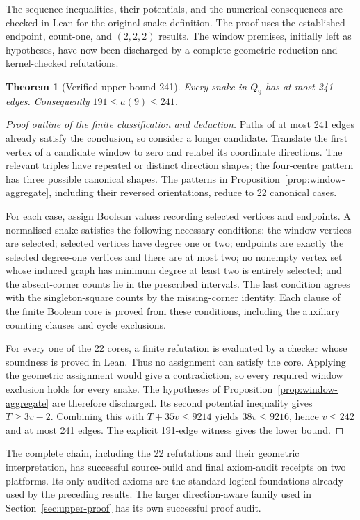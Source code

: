 \documentclass[11pt,a4paper]{article}
\newtheorem{theorem}{Theorem}[section]
\theoremstyle{definition}
\theoremstyle{remark}
\newcommand{\Q}{Q}
\begin{document}
The sequence inequalities, their potentials, and the numerical consequences are checked in Lean for the original snake definition. The proof uses the established endpoint, count-one, and $(2,2,2)$ results. The window premises, initially left as hypotheses, have now been discharged by a complete geometric reduction and kernel-checked refutations.

\begin{theorem}[Verified upper bound 241]\label{thm:upper241}
Every snake in $\Q_9$ has at most 241 edges. Consequently $191\le a(9)\le241$.
\end{theorem}
\begin{proof}[Proof outline of the finite classification and deduction]
Paths of at most 241 edges already satisfy the conclusion, so consider a longer candidate. Translate the first vertex of a candidate window to zero and relabel its coordinate directions. The relevant triples have repeated or distinct direction shapes; the four-centre pattern has three possible canonical shapes. The patterns in Proposition~\ref{prop:window-aggregate}, including their reversed orientations, reduce to 22 canonical cases.

For each case, assign Boolean values recording selected vertices and endpoints. A normalised snake satisfies the following necessary conditions: the window vertices are selected; selected vertices have degree one or two; endpoints are exactly the selected degree-one vertices and there are at most two; no nonempty vertex set whose induced graph has minimum degree at least two is entirely selected; and the absent-corner counts lie in the prescribed intervals. The last condition agrees with the singleton-square counts by the missing-corner identity. Each clause of the finite Boolean core is proved from these conditions, including the auxiliary counting clauses and cycle exclusions.

For every one of the 22 cores, a finite refutation is evaluated by a checker whose soundness is proved in Lean. Thus no assignment can satisfy the core. Applying the geometric assignment would give a contradiction, so every required window exclusion holds for every snake. The hypotheses of Proposition~\ref{prop:window-aggregate} are therefore discharged. Its second potential inequality gives $T\ge3v-2$. Combining this with $T+35v\le9214$ yields $38v\le9216$, hence $v\le242$ and at most 241 edges. The explicit 191-edge witness gives the lower bound.
\end{proof}
The complete chain, including the 22 refutations and their geometric interpretation, has successful source-build and final axiom-audit receipts on two platforms. Its only audited axioms are the standard logical foundations already used by the preceding results. The larger direction-aware family used in Section~\ref{sec:upper-proof} has its own successful proof audit.
\end{document}
